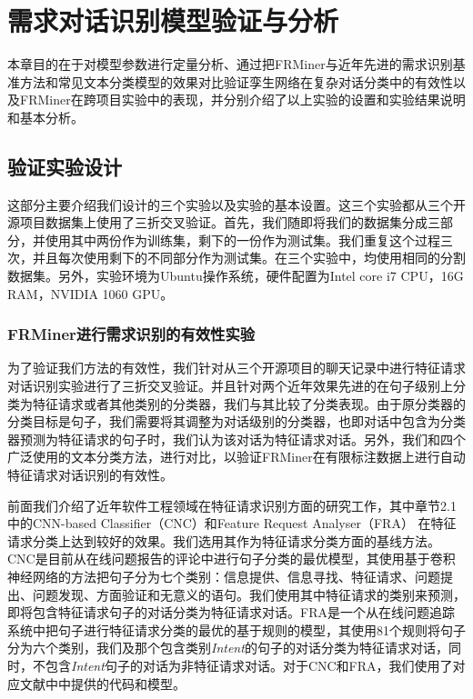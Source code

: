 \chapter{需求对话识别模型验证与分析}
本章目的在于对模型参数进行定量分析、通过把FRMiner与近年先进的需求识别基准方法和常见文本分类模型的效果对比验证孪生网络在复杂对话分类中的有效性以及FRMiner在跨项目实验中的表现，并分别介绍了以上实验的设置和实验结果说明和基本分析。

\section{验证实验设计}
这部分主要介绍我们设计的三个实验以及实验的基本设置。这三个实验都从三个开源项目数据集上使用了三折交叉验证\cite{DBLP:conf/ijcai/Kohavi95}。首先，我们随即将我们的数据集分成三部分，并使用其中两份作为训练集，剩下的一份作为测试集。我们重复这个过程三次，并且每次使用剩下的不同部分作为测试集。在三个实验中，均使用相同的分割数据集。另外，实验环境为Ubuntu操作系统，硬件配置为Intel core i7 CPU，16G RAM，NVIDIA 1060 GPU。
\subsection{FRMiner进行需求识别的有效性实验}
为了验证我们方法的有效性，我们针对从三个开源项目的聊天记录中进行特征请求对话识别实验进行了三折交叉验证。并且针对两个近年效果先进的在句子级别上分类为特征请求或者其他类别的分类器，我们与其比较了分类表现。由于原分类器的分类目标是句子，我们需要将其调整为对话级别的分类器，也即对话中包含为分类器预测为特征请求的句子时，我们认为该对话为特征请求对话。另外，我们和四个广泛使用的文本分类方法，进行对比，以验证FRMiner在有限标注数据上进行自动特征请求对话识别的有效性。

前面我们介绍了近年软件工程领域在特征请求识别方面的研究工作，其中章节2.1中的CNN-based Classifier（CNC）\cite{Huang2018Automating}和Feature Request Analyser（FRA） \cite{shi2017understanding}在特征请求分类上达到较好的效果。我们选用其作为特征请求分类方面的基线方法。CNC是目前从在线问题报告的评论中进行句子分类的最优模型，其使用基于卷积神经网络的方法把句子分为七个类别：信息提供、信息寻找、特征请求、问题提出、问题发现、方面验证和无意义的语句。我们使用其中特征请求的类别来预测，即将包含特征请求句子的对话分类为特征请求对话。FRA是一个从在线问题追踪系统中把句子进行特征请求分类的最优的基于规则的模型，其使用81个规则将句子分为六个类别，我们及那个包含类别\textit{Intent}的句子的对话分类为特征请求对话，同时，不包含\textit{Intent}句子的对话为非特征请求对话。对于CNC和FRA，我们使用了对应文献中中提供的代码和模型。

